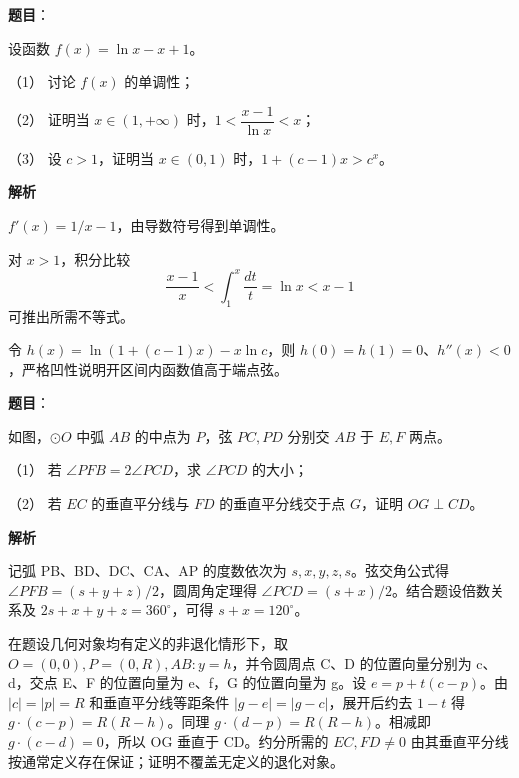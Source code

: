 \begin{answer}

\textbf{题目}：

设函数 \(f(x)=\ln x-x+1\)。

（1） 讨论 \(f(x)\) 的单调性；

（2） 证明当 \(x\in(1,+\infty)\) 时，\(1<\dfrac{x-1}{\ln x}<x\)；

（3） 设 \(c>1\)，证明当 \(x\in(0,1)\) 时，\(1+(c-1)x>c^x\)。

\textbf{解析}


\(f'(x)=1/x-1\)，由导数符号得到单调性。


对 \(x>1\)，积分比较
\nopagebreak[4]
\[
\frac{x-1}{x}<\int_1^x\frac{dt}{t}=\ln x<x-1
\]
可推出所需不等式。


令 \(h(x)=\ln(1+(c-1)x)-x\ln c\)，则 \(h(0)=h(1)=0\)、\(h''(x)<0\)，严格凹性说明开区间内函数值高于端点弦。




\end{answer}
\begin{answer}

\textbf{题目}：

如图，\(\odot O\) 中弧 \(AB\) 的中点为 \(P\)，弦 \(PC,PD\) 分别交 \(AB\) 于 \(E,F\) 两点。
\nopagebreak[4]
\begin{center}\end{center}
\nopagebreak[4]
（1） 若 \(\angle PFB=2\angle PCD\)，求 \(\angle PCD\) 的大小；

（2） 若 \(EC\) 的垂直平分线与 \(FD\) 的垂直平分线交于点 \(G\)，证明 \(OG\perp CD\)。

\textbf{解析}


记弧 PB、BD、DC、CA、AP 的度数依次为 \(s,x,y,z,s\)。弦交角公式得 \(\angle PFB=(s+y+z)/2\)，圆周角定理得 \(\angle PCD=(s+x)/2\)。结合题设倍数关系及 \(2s+x+y+z=360^\circ\)，可得 \(s+x=120^\circ\)。


在题设几何对象均有定义的非退化情形下，取 \(O=(0,0),P=(0,R),AB:y=h\)，并令圆周点 C、D 的位置向量分别为 c、d，交点 E、F 的位置向量为 e、f，G 的位置向量为 g。设 \(e=p+t(c-p)\)。由 \(|c|=|p|=R\) 和垂直平分线等距条件 \(|g-e|=|g-c|\)，展开后约去 \(1-t\) 得 \(g\cdot(c-p)=R(R-h)\)。同理 \(g\cdot(d-p)=R(R-h)\)。相减即 \(g\cdot(c-d)=0\)，所以 OG 垂直于 CD。约分所需的 \(EC,FD\ne0\) 由其垂直平分线按通常定义存在保证；证明不覆盖无定义的退化对象。



\end{answer}
